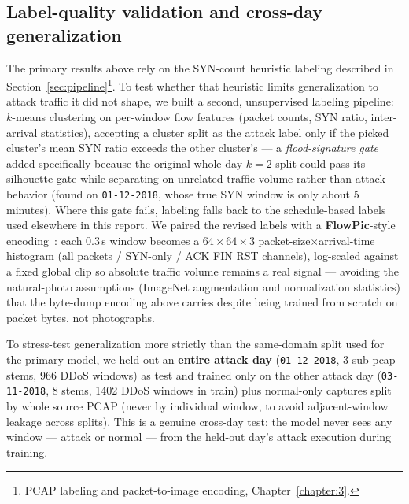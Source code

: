 \subsection{Label-quality validation and cross-day generalization}
\label{sec:labelvalidation}
The primary results above rely on the SYN-count heuristic labeling
described in Section~\ref{sec:pipeline}\footnote{PCAP labeling and
packet-to-image encoding, Chapter~\ref{chapter:3}.}. To test whether that
heuristic limits generalization to attack traffic it did not shape, we
built a second, unsupervised labeling pipeline: $k$-means clustering on
per-window flow features (packet counts, SYN ratio, inter-arrival
statistics), accepting a cluster split as the attack label only if the
picked cluster's mean SYN ratio exceeds the other cluster's --- a
\emph{flood-signature gate} added specifically because the original
whole-day $k=2$ split could pass its silhouette gate while separating on
unrelated traffic volume rather than attack behavior (found on
\texttt{01-12-2018}, whose true SYN window is only about 5 minutes).
Where this gate fails, labeling falls back to the schedule-based labels
used elsewhere in this report. We paired the revised labels with a
\textbf{FlowPic}-style encoding~\cite{shapira2019flowpic}: each 0.3\,s
window becomes a $64\times64\times3$ packet-size$\times$arrival-time
histogram (all packets / SYN-only / ACK\,\textbar\,FIN\,\textbar\,RST
channels), log-scaled against a fixed global clip so absolute traffic
volume remains a real signal --- avoiding the natural-photo assumptions
(ImageNet augmentation and normalization statistics) that the byte-dump
encoding above carries despite being trained from scratch on packet
bytes, not photographs.

To stress-test generalization more strictly than the same-domain split
used for the primary model, we held out an \textbf{entire attack day}
(\texttt{01-12-2018}, 3 sub-pcap stems, 966 DDoS windows) as test and
trained only on the other attack day (\texttt{03-11-2018}, 8 stems, 1402
DDoS windows in train) plus normal-only captures split by whole source
PCAP (never by individual window, to avoid adjacent-window leakage across
splits). This is a genuine cross-day test: the model never sees any
window --- attack or normal --- from the held-out day's attack execution
during training.

